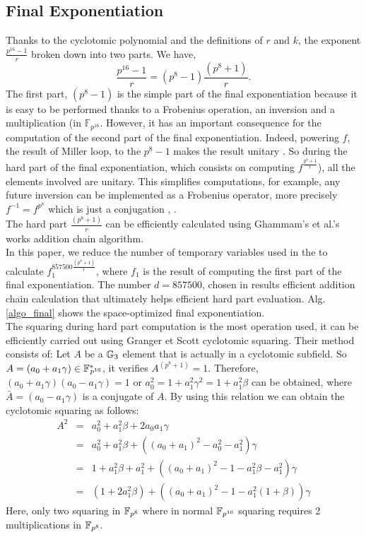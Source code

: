 \subsection{Final Exponentiation}
Thanks to the cyclotomic polynomial and the definitions of $r$ and $k$, the exponent $\frac{p^{16}-1}{r}$  broken down into two parts. We have,
$$\frac{p^{16}-1}{r}=(p^8-1)\frac{(p^8+1)}{r}.$$
The first part, $(p^8-1)$ is the simple part of the final exponentiation
because it is easy to be performed thanks to a Frobenius operation, an inversion and a multiplication (in $\mathbb{F}_{p^{16}}$. 
However, it has an important consequence for the computation of the second part of the final exponentiation. 
Indeed, powering $f$, the result of Miller loop,  to the ${p^8-1}$ makes the result unitary \cite{C:ScoBar04}. So during the hard part of the final exponentiation, which consists on computing $f^{\frac{p^8+1}{r}}$), all the elements involved are unitary.
This  simplifies computations, for example, any future inversion can be implemented as a Frobenius operator, more precisely $f^{-1}=f^{p^8}$ which is just a conjugation \cite{C:ScoBar04}, \cite{CHES:StaLen02}. \\
The hard part $\frac{(p^8+1)}{r}$ can be efficiently calculated using Ghammam's et al.'s works \cite{EPRINT:GhaFou16b} addition chain algorithm.\\
In this paper, we  reduce the number of temporary variables used in the  \cite{EPRINT:GhaFou16b} to calculate $f_1^{857500{\frac{(p^8+1)}{r}}}$, where   $f_1 $ is the result of computing the first part of the final exponentiation. 
The  number $d=857500$, chosen in  \cite{EPRINT:GhaFou16b}  results efficient addition chain calculation  that ultimately helps efficient hard part evaluation.
Alg. \ref{algo_final}  shows the space-optimized final exponentiation. \\
The squaring during hard part computation is the most operation used, it can be efficiently carried out using Granger et Scott  \cite{PKC:GraSco10} cyclotomic squaring. Their method consists of:
Let $A$ be a ${\mathbb{G}}_{3}$ element that is actually  in a cyclotomic subfield.  So $A = (a_0+a_1\gamma) \in {{\mathbb{F}}^{\ast}}_{\!\!\!p^{16}}$, it verifies $A^{(p^8+1)}=1$. Therefore,  $(a_0+a_1\gamma) (a_0-a_1\gamma)=1$ or $a_0^2=1+a_1^2\gamma^2 =  1+a_1^2\beta$ can be obtained, where  $\bar{A}=(a_0-a_1\gamma)$ is a conjugate of $A$. 
By using this relation we can obtain the cyclotomic squaring as follows:
\begin{eqnarray}
A^2& = &a_0^2+a_1^2 \beta+2a_0a_1\gamma \nonumber \\
&  = & a_0^2+a_1^2 \beta +((a_0+a_1)^2-a_0^2 -a_1^2)  \gamma\nonumber \\
&=& 1+ a_1^2 \beta + a_1^2 + ((a_0+a_1)^2- 1-a_1^2\beta -a_1^2)\gamma \nonumber \\
&=&  (1+ 2a_1^2 \beta)  + ((a_0+a_1)^2- 1-a_1^2(1+\beta) )\gamma \nonumber 
\end{eqnarray}
Here, only two squaring in $\mathbb{F}_{p^{8}}$ where in normal $\mathbb{F}_{p^{16}}$ squaring requires 2 multiplications in $\mathbb{F}_{p^{8}}$.


